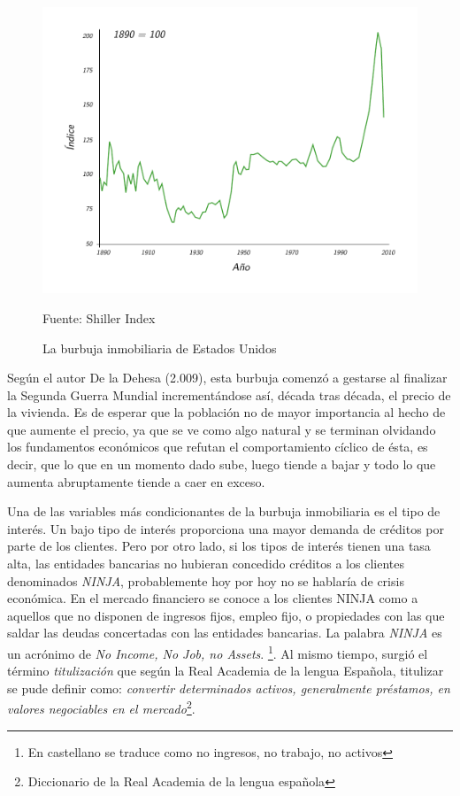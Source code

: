 \begin{figure}[!h] 
\caption{La burbuja inmobiliaria de Estados Unidos} 
\centering \includegraphics[width=150mm]{capitulos/graficos/HousingBubbleUSA} 
\label{fig:HousingBubbleUSA} 

	\footnotesize
	Fuente: Shiller Index

\end{figure}

Según el autor De la Dehesa (2.009), esta burbuja comenzó a gestarse al finalizar la Segunda Guerra Mundial incrementándose así, década tras década, el precio de la vivienda. Es de esperar que la población no de mayor importancia al hecho de que aumente el precio, ya que se ve como algo natural y se terminan olvidando los fundamentos económicos que refutan el comportamiento cíclico de ésta, es decir, que lo que en un momento dado sube, luego tiende a bajar y todo lo que aumenta abruptamente tiende a caer en exceso.

Una de las variables más condicionantes de la burbuja inmobiliaria es el tipo de interés. Un bajo tipo de interés proporciona una mayor demanda de créditos por parte de los clientes. Pero por otro lado, si los tipos de interés tienen una tasa alta, las entidades bancarias no hubieran concedido créditos a los clientes denominados \emph{NINJA}, probablemente hoy por hoy no se hablaría de crisis económica. En el mercado financiero se conoce a los clientes NINJA como a aquellos que no disponen de ingresos fijos, empleo fijo, o propiedades con las que saldar las deudas concertadas con las entidades bancarias. La palabra \emph{NINJA} es un acrónimo de \emph{No Income, No Job, no Assets}. \footnote{En castellano se traduce como no ingresos, no trabajo, no activos}. Al mismo tiempo, surgió el término \emph{titulización} que según la Real Academia de la lengua Española, titulizar se pude definir como: \emph{convertir determinados activos, generalmente préstamos, en valores negociables en el mercado}\footnote{Diccionario de la Real Academia de la lengua española}.

